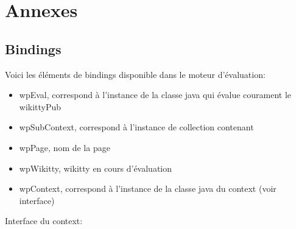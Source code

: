 \section{Annexes}

\subsection*{Bindings}

Voici les éléments de bindings disponible dans le moteur d'évaluation:
	
\begin{itemize}
\item wpEval, correspond à l'instance de la classe java qui évalue courament le wikittyPub
\item wpSubContext, correspond à l'instance de collection contenant 
\item wpPage, nom de la page 
\item wpWikitty, wikitty en cours d'évaluation
\item wpContext, correspond à l'instance de la classe java du context (voir interface)
\end{itemize}

Interface du context:


